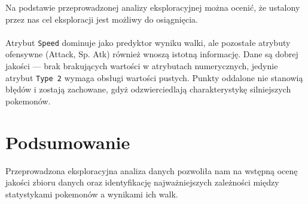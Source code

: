 \documentclass[12pt, a4paper]{report}
\begin{document}
Na podstawie przeprowadzonej analizy eksploracyjnej można ocenić, że ustalony przez nas cel eksploracji jest możliwy do osiągnięcia.\\\\ \noindent Atrybut \texttt{Speed} dominuje jako predyktor wyniku walki, ale pozostałe atrybuty ofensywne (Attack, Sp. Atk) również wnoszą istotną informację. Dane są dobrej jakości — brak brakujących wartości w atrybutach numerycznych, jedynie atrybut \texttt{Type 2} wymaga obsługi wartości pustych. Punkty oddalone nie stanowią błędów i zostają zachowane, gdyż odzwierciedlają charakterystykę silniejszych pokemonów.

\section{Podsumowanie}

Przeprowadzona eksploracyjna analiza danych pozwoliła nam na wstępną ocenę jakości zbioru danych oraz identyfikację najważniejszych zależności między statystykami pokemonów a wynikami ich walk.
\end{document}
